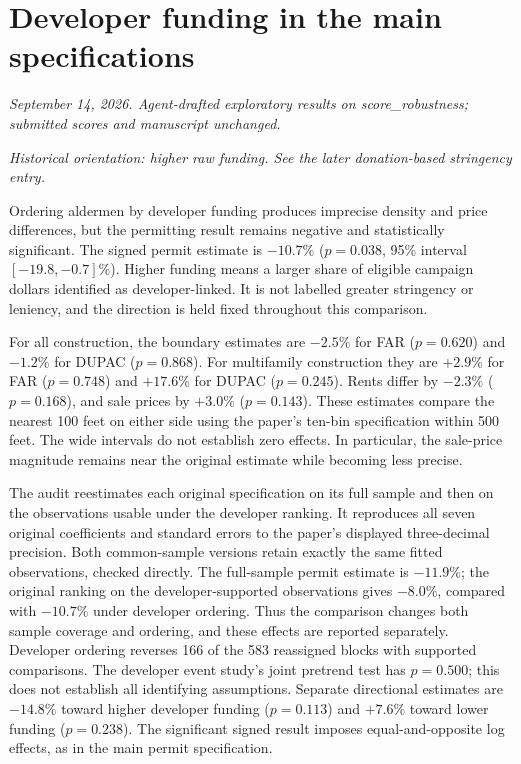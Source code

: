 \clearpage
\section*{Developer funding in the main specifications}
\textit{September 14, 2026. Agent-drafted exploratory results on score\_robustness; submitted scores and manuscript unchanged.}

\textit{Historical orientation: higher raw funding. See the later donation-based stringency entry.}

Ordering aldermen by developer funding produces imprecise density and price differences, but the permitting result remains negative and statistically significant. The signed permit estimate is $-10.7\%$ ($p=0.038$, 95\% interval $[-19.8,-0.7]\%$). Higher funding means a larger share of eligible campaign dollars identified as developer-linked. It is not labelled greater stringency or leniency, and the direction is held fixed throughout this comparison.

For all construction, the boundary estimates are $-2.5\%$ for FAR ($p=0.620$) and $-1.2\%$ for DUPAC ($p=0.868$). For multifamily construction they are $+2.9\%$ for FAR ($p=0.748$) and $+17.6\%$ for DUPAC ($p=0.245$). Rents differ by $-2.3\%$ ($p=0.168$), and sale prices by $+3.0\%$ ($p=0.143$). These estimates compare the nearest 100 feet on either side using the paper's ten-bin specification within 500 feet. The wide intervals do not establish zero effects. In particular, the sale-price magnitude remains near the original estimate while becoming less precise.

The audit reestimates each original specification on its full sample and then on the observations usable under the developer ranking. It reproduces all seven original coefficients and standard errors to the paper's displayed three-decimal precision. Both common-sample versions retain exactly the same fitted observations, checked directly. The full-sample permit estimate is $-11.9\%$; the original ranking on the developer-supported observations gives $-8.0\%$, compared with $-10.7\%$ under developer ordering. Thus the comparison changes both sample coverage and ordering, and these effects are reported separately. Developer ordering reverses 166 of the 583 reassigned blocks with supported comparisons. The developer event study's joint pretrend test has $p=0.500$; this does not establish all identifying assumptions. Separate directional estimates are $-14.8\%$ toward higher developer funding ($p=0.113$) and $+7.6\%$ toward lower funding ($p=0.238$). The significant signed result imposes equal-and-opposite log effects, as in the main permit specification.

